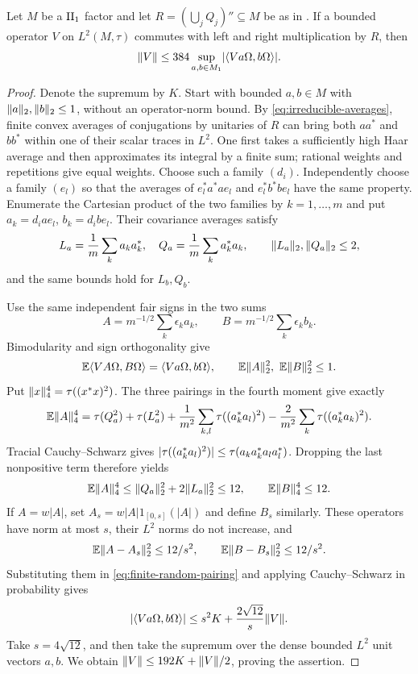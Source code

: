 \begin{lemma}
\label{lem:finite-ball-tests}
Let $M$ be a $\mathrm{II}_1$ factor and let $R=(\bigcup_jQ_j)''\subseteq M$
be as in .  If a bounded operator $V$
on $L^2(M,\tau)$ commutes with left and right multiplication by $R$, then
\[
 \lVert V\rVert\le384\sup_{a,b\in M_1}
       \lvert\langle Va\Omega,b\Omega\rangle\rvert.
\]
\end{lemma}
\begin{proof}
Denote the supremum by $K$.  Start with bounded $a,b\in M$ with
$\lVert a\rVert_2,\lVert b\rVert_2\le1$, without an operator-norm bound.
By \eqref{eq:irreducible-averages}, finite convex averages of conjugations
by unitaries of $R$ can bring both $aa^*$ and $bb^*$ within one of their
scalar traces in $L^2$.  One first takes a sufficiently high Haar average
and then approximates its integral by a finite sum; rational weights and
repetitions give equal weights.  Choose such a family $(d_i)$.
Independently choose a family $(e_l)$ so that the averages of
$e_l^*a^*ae_l$ and $e_l^*b^*be_l$ have the same property.  Enumerate the
Cartesian product of the two families by $k=1,\ldots,m$ and put
$a_k=d_i a e_l$, $b_k=d_i b e_l$.  Their covariance averages satisfy
\[
 L_a=\frac1m\sum_k a_ka_k^*,\quad
 Q_a=\frac1m\sum_k a_k^*a_k,\qquad
 \lVert L_a\rVert_2,\lVert Q_a\rVert_2\le2,
\]
and the same bounds hold for $L_b,Q_b$.

Use the same independent fair signs in the two sums
\[
 A=m^{-1/2}\sum_k\epsilon_k a_k,\qquad
 B=m^{-1/2}\sum_k\epsilon_k b_k.
\]
Bimodularity and sign orthogonality give
\begin{equation}
 \mathbb E\langle VA\Omega,B\Omega\rangle=\langle Va\Omega,b\Omega\rangle,
 \qquad \mathbb E\lVert A\rVert_2^2,\ \mathbb E\lVert B\rVert_2^2\le1.
 \label{eq:finite-random-pairing}
\end{equation}
Put $\lVert x\rVert_4^4=\tau((x^*x)^2)$. The three pairings in the
fourth moment give exactly
\[
 \mathbb E\lVert A\rVert_4^4
 =\tau(Q_a^2)+\tau(L_a^2)
  +\frac1{m^2}\sum_{k,l}\tau((a_k^*a_l)^2)
  -\frac2{m^2}\sum_k\tau((a_k^*a_k)^2).
\]
Tracial Cauchy--Schwarz gives
$\lvert\tau((a_k^*a_l)^2)\rvert\le\tau(a_ka_k^*a_la_l^*)$.
Dropping the last nonpositive term therefore yields
\[
 \mathbb E\lVert A\rVert_4^4\le\lVert Q_a\rVert_2^2+2\lVert L_a\rVert_2^2\le12,
 \qquad \mathbb E\lVert B\rVert_4^4\le12.
\]
If $A=w|A|$, set $A_s=w|A|1_{[0,s]}(|A|)$ and define $B_s$ similarly.
These operators have norm at most $s$, their $L^2$ norms do not increase,
and
\[
 \mathbb E\lVert A-A_s\rVert_2^2\le12/s^2,
 \qquad \mathbb E\lVert B-B_s\rVert_2^2\le12/s^2.
\]
Substituting them in \eqref{eq:finite-random-pairing} and applying
Cauchy--Schwarz in probability gives
\[
 \lvert\langle Va\Omega,b\Omega\rangle\rvert
 \le s^2K+\frac{2\sqrt{12}}s\lVert V\rVert.
\]
Take $s=4\sqrt{12}$, and then take the supremum over the dense bounded
$L^2$ unit vectors $a,b$.  We obtain
$\lVert V\rVert\le192K+\lVert V\rVert/2$, proving the assertion.
\end{proof}

